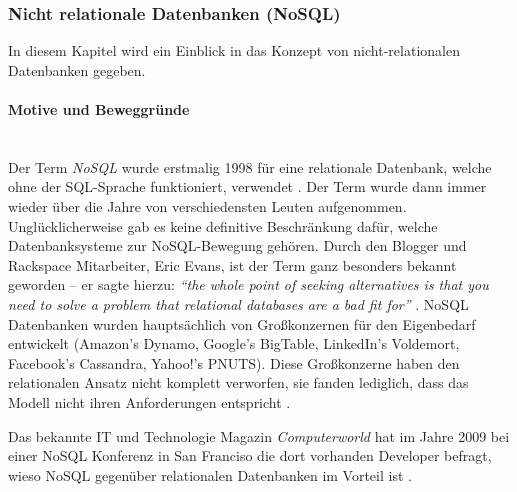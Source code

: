 \subsubsection{Nicht relationale Datenbanken (NoSQL)}
\label{subsec:nichtrelationaleDB}

In diesem Kapitel wird ein Einblick in das Konzept von nicht-relationalen Datenbanken gegeben. 

\paragraph{Motive und Beweggründe}\mbox{}\\
Der Term \textit{NoSQL} wurde erstmalig 1998 für eine relationale Datenbank, welche ohne der SQL-Sprache funktioniert, verwendet \cite{MELD.CH2-noSQL.firstSQLNaming}. Der Term wurde dann immer wieder über die Jahre von verschiedensten Leuten aufgenommen. Unglücklicherweise gab es keine definitive Beschränkung dafür, welche Datenbanksysteme zur NoSQL-Bewegung gehören. Durch den Blogger und Rackspace Mitarbeiter, Eric Evans, ist der Term ganz besonders bekannt geworden – er sagte hierzu: \textit{“the whole point of seeking alternatives is that you need to solve a problem that relational databases are a bad fit for”} \cite{MELD.CH2-noSQL.whatsInAName}. NoSQL Datenbanken wurden hauptsächlich von Großkonzernen für den Eigenbedarf entwickelt (Amazon’s Dynamo, Google’s BigTable, LinkedIn’s Voldemort, Facebook’s Cassandra, Yahoo!’s PNUTS). Diese Großkonzerne haben den relationalen Ansatz nicht komplett verworfen, sie fanden lediglich, dass das Modell nicht ihren Anforderungen entspricht \cite{MELD.CH2-noSQL.capTheoremComp}.

Das bekannte IT und Technologie Magazin \textit{Computerworld} hat im Jahre 2009 bei einer NoSQL Konferenz in San Franciso die dort vorhanden Developer befragt, wieso NoSQL gegenüber relationalen Datenbanken im Vorteil ist \cite{MELD.CH2-noSQL.whyItsBetter}.

